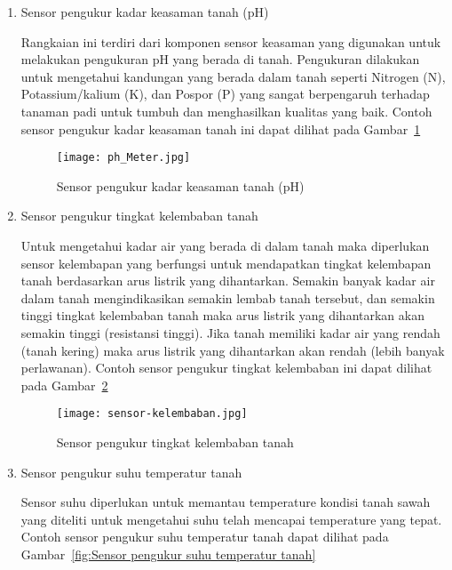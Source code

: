 \begin{enumerate}
    \item Sensor pengukur kadar keasaman tanah (pH)
    
    Rangkaian ini terdiri dari komponen sensor keasaman yang digunakan untuk melakukan pengukuran pH yang berada di tanah. Pengukuran dilakukan untuk mengetahui kandungan yang berada dalam tanah seperti Nitrogen (N), Potassium/kalium (K), dan Pospor (P) yang sangat berpengaruh terhadap tanaman padi untuk tumbuh dan menghasilkan kualitas yang baik. Contoh sensor pengukur kadar keasaman tanah ini dapat dilihat pada Gambar~\ref{fig:Sensor pengukur kadar keasaman tanah (pH)}
    
    \begin{figure}[H]
    	\centering  
    	\texttt{[image: ph\_Meter.jpg]}  
    	\caption[Sensor pengukur kadar keasaman tanah (pH)]{Sensor pengukur kadar keasaman tanah (pH)} 
    	\label{fig:Sensor pengukur kadar keasaman tanah (pH)} 
    \end{figure}
    
    \item Sensor pengukur tingkat kelembaban tanah
    
    Untuk mengetahui kadar air yang berada di dalam tanah maka diperlukan sensor kelembapan yang berfungsi untuk mendapatkan tingkat kelembapan tanah berdasarkan arus listrik yang dihantarkan. Semakin banyak kadar air dalam tanah mengindikasikan semakin lembab tanah tersebut, dan semakin tinggi tingkat kelembaban tanah maka arus listrik yang dihantarkan akan semakin tinggi (resistansi tinggi). Jika tanah memiliki kadar air yang rendah (tanah kering) maka arus listrik yang dihantarkan akan rendah (lebih banyak perlawanan). Contoh sensor pengukur tingkat kelembaban ini dapat dilihat pada Gambar~\ref{fig:Sensor pengukur tingkat kelembaban tanah}
    
    \begin{figure}[H]
    	\centering  
    	\texttt{[image: sensor-kelembaban.jpg]}  
    	\caption[Sensor pengukur tingkat kelembaban tanah]{Sensor pengukur tingkat kelembaban tanah} 
    	\label{fig:Sensor pengukur tingkat kelembaban tanah} 
    \end{figure} 
    
    \item Sensor pengukur suhu temperatur tanah

     Sensor suhu diperlukan untuk memantau temperature kondisi tanah sawah yang diteliti untuk mengetahui suhu telah mencapai temperature yang tepat.
     Contoh sensor pengukur suhu temperatur tanah dapat dilihat pada Gambar~\ref{fig:Sensor pengukur suhu temperatur tanah}
     

\end{enumerate}
